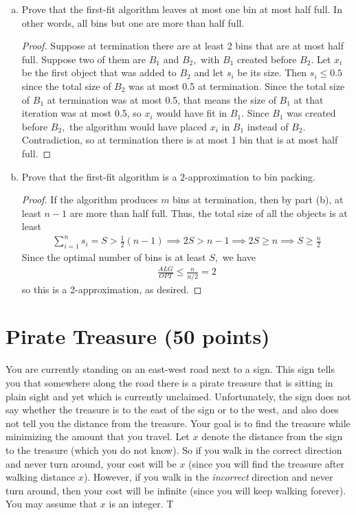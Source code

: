 \documentclass{article}
\begin{document}
\begin{enumerate}[(a), resume]
	\item Prove that the first-fit algorithm leaves at most one bin at most half full.  In other words, all bins but one are more than half full.
		\begin{proof}
			Suppose at termination there are at least 2 bins that are at most half full. Suppose two of them are $B_1$ and $B_2,$ with $B_1$ created before $B_2.$ Let $x_i$ be the first object that was added to $B_2$ and let $s_i$ be its size. Then $s_i\le 0.5$ since the total size of $B_2$ was at most 0.5 at termination. Since the total size of $B_1$ at termination was at most 0.5, that means the size of $B_1$ at that iteration was at most 0.5, so $x_i$ would have fit in $B_1.$ Since $B_1$ was created before $B_2,$ the algorithm would have placed $x_i$ in $B_1$ instead of $B_2.$ Contradiction, so at termination there is at most 1 bin that is at most half full.
		\end{proof}

	\item Prove that the first-fit algorithm is a $2$-approximation to bin packing.
		\begin{proof}
			If the algorithm produces $m$ bins at termination, then by part (b), at least $n-1$ are more than half full. Thus, the total size of all the objects is at least
			\begin{align*}
				\sum_{i=1}^{n} s_i = S > \frac{1}{2} (n-1) \implies 2S > n-1 \implies 2S \ge n \implies S\ge \frac{n}{2}
			\end{align*}
			Since the optimal number of bins is at least $S,$ we have
			\begin{align*}
				\frac{ALG}{OPT} \le \frac{n}{n/2} = 2
			\end{align*}
			so this is a 2-approximation, as desired.
		\end{proof}

\end{enumerate}


\section{Pirate Treasure (50 points)}
You are currently standing on an east-west road next to a sign.  This sign tells you that somewhere along the road there is a pirate treasure that is sitting in plain sight and yet which is currently unclaimed.  Unfortunately, the sign does not say whether the treasure is to the east of the sign or to the west, and also does not tell you the distance from the treasure.  Your goal is to find the treasure while minimizing the amount that you travel.  Let $x$ denote the distance from the sign to the treasure (which you do not know).  So if you walk in the correct direction and never turn around, your cost will be $x$ (since you will find the treasure after walking distance $x$).  However, if you walk in the \emph{incorrect} direction and never turn around, then your cost will be infinite (since you will keep walking forever).  You may assume that $x$ is an integer.  T
\end{document}
